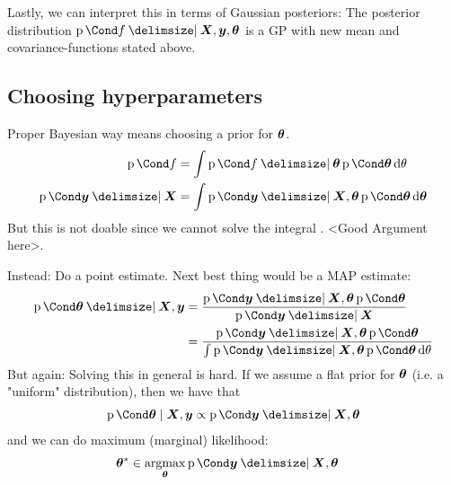 Lastly, we can interpret this in terms of Gaussian posteriors: The posterior distribution $\Prob{f \given \mat{X}, \mat{y}, \mat{\theta}}$ is a GP with new mean and covariance-functions stated above.

\subsection{Choosing hyperparameters}
Proper Bayesian way means choosing a prior for $\bm{\theta}$.
\begin{align}
    \Prob{f} &= \int \Prob{f \given \mat{\theta}} \Prob{\mat{\theta}} \diff \theta \\
    \Prob{\mat{y} \given \mat{X}} &= \int \Prob{\mat{y} \given \mat{X}, \mat{\theta}} \Prob{\mat{\theta}} \diff \mat{\theta}
\end{align}
But this is not doable since we cannot solve the integral \cite[109]{rasmussen_gaussian_2006}. <Good Argument here>.

Instead: Do a point estimate. Next best thing would be a MAP estimate:
\begin{align}
    \Prob{\mat{\theta} \given \mat{X}, \mat{y}} &= \frac{\Prob{\mat{y} \given \mat{X}, \mat{\theta}} \Prob{\mat{\theta}}}{\Prob{\mat{y} \given \mat{X}}} \\ &= \frac{\Prob{\mat{y} \given \mat{X}, \mat{\theta}} \Prob{\mat{\theta}}}{\int \Prob{\mat{y} \given \mat{X}, \mat{\theta}} \Prob{\mat{\theta}} \diff \theta}
\end{align}
But again: Solving this in general is hard.
If we assume a flat prior for $\bm{\theta}$ (i.e. a "uniform" distribution), then we have that
\begin{align}
    \Prob{\mat{\theta} \mid \mat{X}, \mat{y}} \propto \Prob{\mat{y} \given \mat{X}, \mat{\theta}}
\end{align}
and we can do maximum (marginal) likelihood:
\begin{align}
    \mat{\theta}^\ast &\in \argmax_{\mat{\theta}} \Prob{\mat{y} \given \mat{X}, \mat{\theta}}
\end{align}

